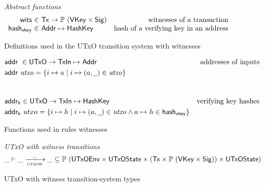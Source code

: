 \begin{figure}[htb]
  \emph{Abstract functions}
  \begin{equation*}
    \begin{array}{r@{~\in~}lr}
      \fun{wits} & \Tx \to \powerset{(\VKey \times \Sig)}
      & \text{witnesses of a transaction}\\
      \fun{hash_{vkey}} & \Addr \mapsto \HashKey
      & \text{hash of a verifying key in an address}\\
    \end{array}
  \end{equation*}
  \caption{Definitions used in the UTxO transition system with witnesses}
  \label{fig:defs:utxow}
\end{figure}
\begin{figure}[htb]
  \begin{align*}
    & \addr{}{} \in \UTxO \to \TxIn \mapsto \Addr & \text{addresses of inputs}\\
    & \addr{utxo} = \{ i \mapsto a \mid i \mapsto (a, \wcard) \in \var{utxo} \} \\
    \nextdef
    & \fun{addr_h} \in \UTxO \to \TxIn \mapsto \HashKey & \text{verifying key hashes}\\
    & \fun{addr_h}~utxo = \{ i \mapsto h \mid i \mapsto (a, \wcard) \in \var{utxo}
      \wedge a \mapsto h \in \fun{hash_{vkey}} \}
  \end{align*}
  \caption{Functions used in rules witnesses}
  \label{fig:derived-defs:utxow}
\end{figure}

\begin{figure}
  \emph{UTxO with witness transitions}
  \begin{equation*}
    \var{\_} \vdash
    \var{\_} \trans{utxow}{\_} \var{\_}
    \subseteq \powerset
    (\UTxOEnv \times \UTxOState \times (\Tx \times \powerset{(\VKey \times \Sig)}) \times \UTxOState)
  \end{equation*}
  \caption{UTxO with witness transition-system types}
  \label{fig:ts-types:utxow}
\end{figure}

